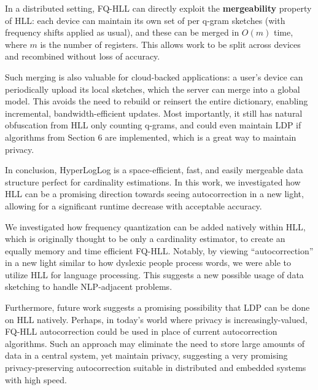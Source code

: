 \documentclass[12pt,a4paper]{article}
\begin{document}
In a distributed setting, FQ-HLL can directly exploit the \textbf{mergeability} property of HLL: each device can maintain its own set of per q-gram sketches (with frequency shifts applied as usual), and these can be merged in $O(m)$ time, where $m$ is the number of registers. This allows work to be split across devices and recombined without loss of accuracy. \newline

Such merging is also valuable for cloud-backed applications: a user's device can periodically upload its local sketches, which the server can merge into a global model. This avoids the need to rebuild or reinsert the entire dictionary, enabling incremental, bandwidth-efficient updates. Most importantly, it still has natural obfuscation from HLL only counting q-grams, and could even maintain LDP if algorithms from Section 6 are implemented, which is a great way to maintain privacy. \newline

In conclusion, HyperLogLog is a space-efficient, fast, and easily mergeable data structure perfect for cardinality estimations. In this work, we investigated how HLL can be a promising direction towards seeing autocorrection in a new light, allowing for a significant runtime decrease with acceptable accuracy. \newline 

We investigated how frequency quantization can be added natively within HLL, which is originally thought to be only a cardinality estimator, to create an equally memory and time efficient FQ-HLL. Notably, by viewing ``autocorrection'' in a new light similar to how dyslexic people process words, we were able to utilize HLL for language processing. This suggests a new possible usage of data sketching to handle NLP-adjacent problems. \newline 

Furthermore, future work suggests a promising possibility that LDP can be done on HLL natively. Perhaps, in today's world where privacy is increasingly-valued, FQ-HLL autocorrection could be used in place of current autocorrection algorithms. Such an approach may eliminate the need to store large amounts of data in a central system, yet maintain privacy, suggesting a very promising privacy-preserving autocorrection suitable in distributed and embedded systems with high speed. \newline

\printbibliography[heading=blueboxed]

\end{document}
